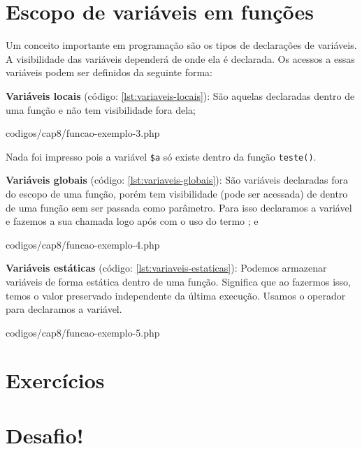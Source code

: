 \section{Escopo de variáveis em funções}
\label{escopo-de-variaveis-em-funcoes}

Um conceito importante em programação são os tipos de declarações de variáveis.
A visibilidade das variáveis dependerá de onde ela é declarada. Os acessos a essas 
variáveis podem ser definidos da seguinte forma:

\textbf{Variáveis locais} (código: \ref{lst:variaveis-locais}): São aquelas 
  declaradas dentro de uma função e não tem visibilidade fora dela;


{codigos/cap8/funcao-exemplo-3.php}

Nada foi impresso pois a variável \texttt{\$a} só existe dentro da função \texttt{teste()}.

\textbf{Variáveis globais} (código: \ref{lst:variaveis-globais}): São variáveis 
  declaradas fora do escopo de uma função, porém tem visibilidade (pode ser acessada) 
  de dentro de uma função sem ser passada como parâmetro. Para isso declaramos a 
  variável e fazemos a sua chamada logo após com o uso do termo \comandoglobal; e


{codigos/cap8/funcao-exemplo-4.php}

\textbf{Variáveis estáticas} (código: \ref{lst:variaveis-estaticas}): Podemos 
  armazenar variáveis de forma estática dentro de uma função. Significa que ao 
  fazermos isso, temos o valor preservado independente da última execução. 
  Usamos o operador \comandostatic~ para declaramos a variável. 


{codigos/cap8/funcao-exemplo-5.php}

\section{Exercícios}
\label{cap8-exercicios}

\section{Desafio!}
\label{cap8-desafio}